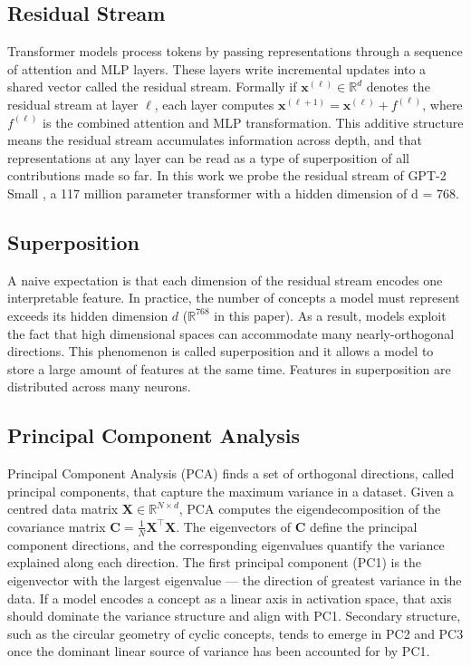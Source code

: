 \documentclass[11pt]{article}
\begin{document}
\subsection{Residual Stream}
Transformer models process tokens by passing representations through a sequence of attention and MLP layers. 
These layers write incremental updates into a shared vector called the residual stream. Formally if $\mathbf{x}^{(\ell)} \in \mathbb{R}^d$
denotes the residual stream at layer $\ell$, each layer computes $\mathbf{x}^{(\ell+1)} = \mathbf{x}^{(\ell)} + f^{(\ell)}$, where 
$f^{(\ell)}$ is the combined attention and MLP transformation. This additive structure means the residual stream accumulates information 
across depth, and that representations at any layer can be read as a type of superposition of all contributions made so far.
In this work we probe the residual stream of GPT-2 Small \cite{radford2019}, a 117 million parameter transformer with a hidden dimension of d = 768. 
\subsection{Superposition}
A naive expectation is that each dimension of the residual stream encodes one interpretable feature. In practice, the number of concepts
a model must represent exceeds its hidden dimension $d$ ($\mathbb{R}^{768}$ in this paper). As a result, models exploit the fact that high 
dimensional spaces can accommodate many nearly-orthogonal directions. This phenomenon is called superposition and it allows a model to 
store a large amount of features at the same time. Features in superposition are distributed across many neurons. 

\subsection{Principal Component Analysis}
Principal Component Analysis (PCA) finds a set of orthogonal directions, called principal components, that capture the maximum
variance in a dataset. Given a centred data matrix $\mathbf{X} \in \mathbb{R}^{N \times d}$, PCA computes the eigendecomposition
of the covariance matrix $\mathbf{C} = \frac{1}{N}\mathbf{X}^\top\mathbf{X}$. The eigenvectors of $\mathbf{C}$ define the principal
component directions, and the corresponding eigenvalues quantify the variance explained along each direction. The first principal
component (PC1) is the eigenvector with the largest eigenvalue --- the direction of greatest variance in the data. If a model
encodes a concept as a linear axis in activation space, that axis should dominate the variance structure and align with PC1.
Secondary structure, such as the circular geometry of cyclic concepts, tends to emerge in PC2 and PC3 once the dominant
linear source of variance has been accounted for by PC1.
\end{document}
